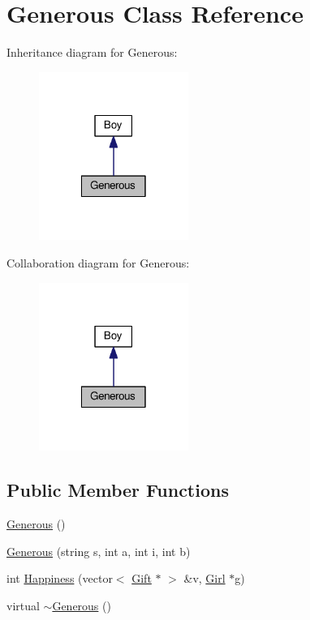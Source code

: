 \hypertarget{class_generous}{\section{Generous Class Reference}
\label{class_generous}
}


Inheritance diagram for Generous\-:
\nopagebreak
\begin{figure}[H]
\begin{center}
\leavevmode
\includegraphics[width=138pt]{class_generous__inherit__graph}
\end{center}
\end{figure}


Collaboration diagram for Generous\-:
\nopagebreak
\begin{figure}[H]
\begin{center}
\leavevmode
\includegraphics[width=138pt]{class_generous__coll__graph}
\end{center}
\end{figure}
\subsection*{Public Member Functions}
\begin{DoxyCompactItemize}
\item 
\hyperlink{class_generous_ac82a953dcfa6eac1fa1678cc545d6ebc}{Generous} ()
\item 
\hyperlink{class_generous_ab0b66194448ff8590de826abfc160770}{Generous} (string s, int a, int i, int b)
\item 
int \hyperlink{class_generous_aa2f8f56436e7897c66863061da9c9022}{Happiness} (vector$<$ \hyperlink{class_gift}{Gift} $\ast$ $>$ \&v, \hyperlink{class_girl}{Girl} $\ast$g)
\item 
virtual \hyperlink{class_generous_a6e0ada0568984bc8848cf2aedb0e0637}{$\sim$\-Generous} ()
\end{DoxyCompactItemize}
